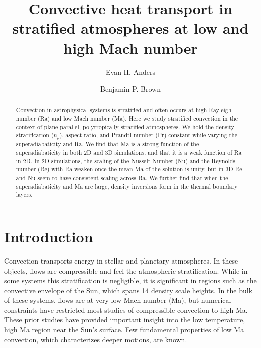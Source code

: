 \documentclass[aps, prl, twocolumn, nofootinbib, groupedaddress, amsfonts, amssymb, amsmath]{revtex4-1}
\newcommand{\RB}{Rayleigh-B\'{e}nard }
\begin{document}
\author{Evan H. Anders}
\author{Benjamin P. Brown}
\title{Convective heat transport in stratified atmospheres at low and high Mach number}

\begin{abstract}
Convection in astrophysical systems is stratified and
often occurs at high Rayleigh number (Ra) and low
Mach number (Ma).
Here we study stratified convection in the context of 
plane-parallel, polytropically stratified atmospheres. 
We hold the density stratification ($n_{\rho}$), aspect
ratio, and Prandtl 
number (Pr) constant while varying the superadiabaticity
and Ra.  We find that Ma is a strong function of the superadiabaticity
in both 2D and 3D simulations, and that it is a 
weak function of Ra in 2D.
In 2D simulations, the scaling of the Nusselt Number (Nu) and the Reynolds number (Re)
with Ra weaken
once the mean Ma of the solution is unity, but in 3D
Re and Nu seem to have consistent scaling across Ra.
We further find that when the superadiabaticity and Ma are large,
density inversions form in the thermal boundary layers.
\end{abstract}
\maketitle


\section{Introduction}
\label{sec:intro}
Convection transports energy in stellar and planetary atmospheres.
In these objects, flows are compressible and
feel the atmospheric stratification.  While in some systems this stratification 
is negligible, it is significant in regions such as
the convective envelope of the Sun, which spans 14 density scale heights.
In the bulk of these systems, flows are at very low Mach number (Ma), 
but numerical constraints have restricted most studies of 
compressible convection to high Ma.
These prior studies have provided important insight into the low temperature, 
high Ma region near the Sun's surface. Few fundamental
properties of low Ma convection, which characterizes deeper motions,
are known.
\end{document}

